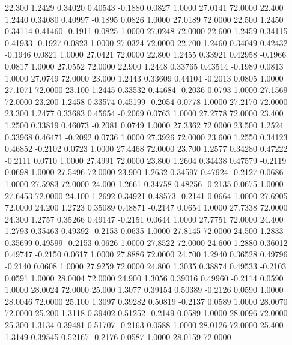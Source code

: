   22.300   1.2429   0.34020   0.40543  -0.1880   0.0827   1.0000  27.0141  72.0000
  22.400   1.2440   0.34080   0.40997  -0.1895   0.0826   1.0000  27.0189  72.0000
  22.500   1.2450   0.34114   0.41460  -0.1911   0.0825   1.0000  27.0248  72.0000
  22.600   1.2459   0.34115   0.41933  -0.1927   0.0823   1.0000  27.0324  72.0000
  22.700   1.2460   0.34049   0.42432  -0.1946   0.0821   1.0000  27.0421  72.0000
  22.800   1.2455   0.33921   0.42958  -0.1966   0.0817   1.0000  27.0552  72.0000
  22.900   1.2448   0.33765   0.43514  -0.1989   0.0813   1.0000  27.0749  72.0000
  23.000   1.2443   0.33609   0.44104  -0.2013   0.0805   1.0000  27.1071  72.0000
  23.100   1.2445   0.33532   0.44684  -0.2036   0.0793   1.0000  27.1569  72.0000
  23.200   1.2458   0.33574   0.45199  -0.2054   0.0778   1.0000  27.2170  72.0000
  23.300   1.2477   0.33683   0.45654  -0.2069   0.0763   1.0000  27.2778  72.0000
  23.400   1.2500   0.33819   0.46073  -0.2081   0.0749   1.0000  27.3362  72.0000
  23.500   1.2524   0.33968   0.46471  -0.2092   0.0736   1.0000  27.3926  72.0000
  23.600   1.2550   0.34123   0.46852  -0.2102   0.0723   1.0000  27.4468  72.0000
  23.700   1.2577   0.34280   0.47222  -0.2111   0.0710   1.0000  27.4991  72.0000
  23.800   1.2604   0.34438   0.47579  -0.2119   0.0698   1.0000  27.5496  72.0000
  23.900   1.2632   0.34597   0.47924  -0.2127   0.0686   1.0000  27.5983  72.0000
  24.000   1.2661   0.34758   0.48256  -0.2135   0.0675   1.0000  27.6453  72.0000
  24.100   1.2692   0.34921   0.48573  -0.2141   0.0664   1.0000  27.6905  72.0000
  24.200   1.2723   0.35089   0.48871  -0.2147   0.0654   1.0000  27.7338  72.0000
  24.300   1.2757   0.35266   0.49147  -0.2151   0.0644   1.0000  27.7751  72.0000
  24.400   1.2793   0.35463   0.49392  -0.2153   0.0635   1.0000  27.8145  72.0000
  24.500   1.2833   0.35699   0.49599  -0.2153   0.0626   1.0000  27.8522  72.0000
  24.600   1.2880   0.36012   0.49747  -0.2150   0.0617   1.0000  27.8886  72.0000
  24.700   1.2940   0.36528   0.49796  -0.2140   0.0608   1.0000  27.9259  72.0000
  24.800   1.3035   0.38874   0.49533  -0.2103   0.0591   1.0000  28.0004  72.0000
  24.900   1.3056   0.39016   0.49960  -0.2114   0.0590   1.0000  28.0024  72.0000
  25.000   1.3077   0.39154   0.50389  -0.2126   0.0590   1.0000  28.0046  72.0000
  25.100   1.3097   0.39282   0.50819  -0.2137   0.0589   1.0000  28.0070  72.0000
  25.200   1.3118   0.39402   0.51252  -0.2149   0.0589   1.0000  28.0096  72.0000
  25.300   1.3134   0.39481   0.51707  -0.2163   0.0588   1.0000  28.0126  72.0000
  25.400   1.3149   0.39545   0.52167  -0.2176   0.0587   1.0000  28.0159  72.0000
